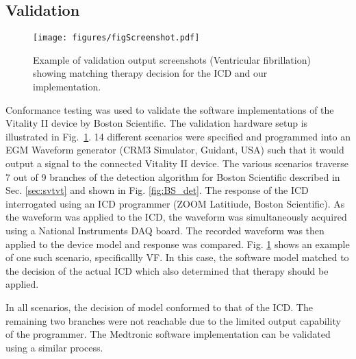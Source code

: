 \subsection{Validation}
\label{sec:validation}
\begin{figure}[t ]
	\centering
	\texttt{[image: figures/figScreenshot.pdf]}
	\caption{\small Example of validation output screenshots (Ventricular fibrillation) showing matching therapy decision for the ICD and our implementation.}
	\vspace{-10pt}
	\label{fig:validation}
\end{figure}

Conformance testing was used to validate the software implementations of the Vitality II device by Boston Scientific. 
The validation hardware setup is illustrated in Fig.~\ref{fig:validation}. 
14 different scenarios were specified and programmed into an EGM Waveform generator (CRM3 Simulator, Guidant, USA) such that it would output a signal to the connected Vitality II device.
The various scenarios traverse 7 out of 9 branches of the detection algorithm for Boston Scientific described in Sec. \ref{sec:svtvt} and shown in Fig. \ref{fig:BS_det}. 
The response of the \ac{ICD} interrogated using an ICD programmer (ZOOM Latitiude, Boston Scientific).
As the waveform was applied to the ICD, the waveform was simultaneously acquired using a National Instruments \ac{DAQ} board.
The recorded waveform was then applied to the device model and response was compared.
Fig. \ref{fig:validation} shows an example of one such scenario, specificallly \ac{VF}. 
In this case, the software model matched to the decision of the actual \ac{ICD} which also determined that therapy should be applied.

In all scenarios, the decision of model conformed to that of the \ac{ICD}. 
The remaining two branches were not reachable due to the limited output capability of the programmer.
The Medtronic software implementation can be validated using a similar process.
